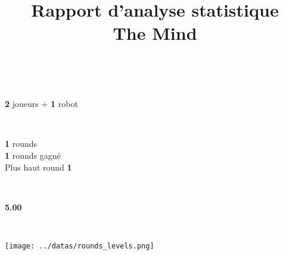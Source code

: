 \documentclass[a4paper,11pt,landscape]{article}
\title{\vspace{-1cm}\Huge \textbf{Rapport d'analyse statistique} \\ \Large The Mind\vspace{-1cm}}
\date{}
\begin{document}
\color{white}
\maketitle
\begin{multicols}{2} %
    \noindent
    \begin{tcolorbox}[colback=ora2,colframe=ora2]
        \begin{tcolorbox}[colback=ora1,colframe=ora1]
            \centering \textcolor{white}{\textbf{Nombre de joueurs}}
        \end{tcolorbox}
    \centering \textbf{
2
    } joueurs + \textbf{
    1
    } robot

    \begin{tcolorbox}[colback=ora1,colframe=ora1]
        \centering \textcolor{white}{\textbf{Rounds}}
    \end{tcolorbox}
        \centering \textbf{
1
        } rounds \\
        \centering \textbf{
1
        } rounds gagné \\
        \centering Plus haut round \textbf{
1
        }

    \begin{tcolorbox}[colback=ora1,colframe=ora1]
        \centering \textcolor{white}{\textbf{Reaction time moyen}}
    \end{tcolorbox}
     \centering \textbf{
5.00
        }

    \end{tcolorbox}

    \vfill

    \noindent
    \begin{tcolorbox}[colback=ora2,colframe=ora2]
        \begin{tcolorbox}[colback=ora1,colframe=ora1]
            \centering \textcolor{white}{\textbf{Niveau des rounds}}
        \end{tcolorbox}
            \centering \texttt{[image: ../datas/rounds\_levels.png]}


    \end{tcolorbox}
    \vfill
\end{multicols}
\end{document}
